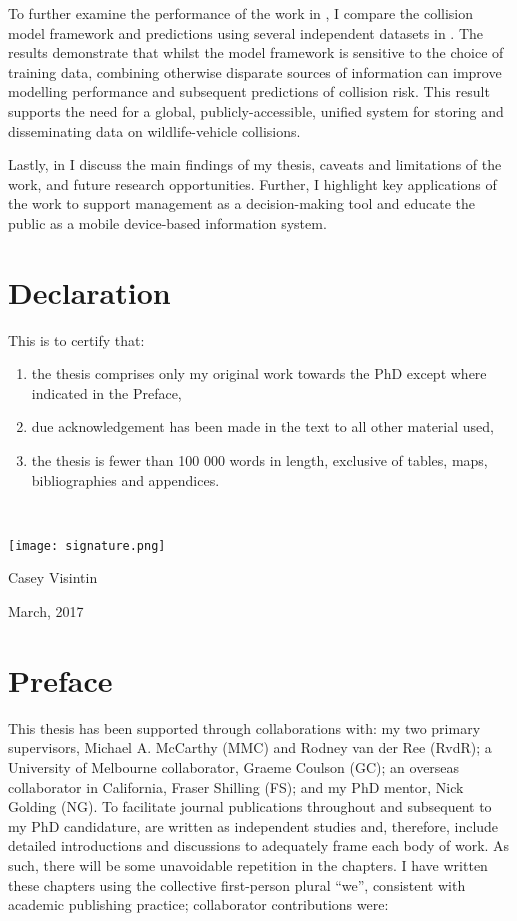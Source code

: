 \documentclass[titlesmallcaps,copyrightpage,examinerscopy]{uomthesis}
\begin{document}
To further examine the performance of the work in , I compare the collision model framework and predictions using several independent datasets in . The results demonstrate that whilst the model framework is sensitive to the choice of training data, combining otherwise disparate sources of information can improve modelling performance and subsequent predictions of collision risk. This result supports the need for a global, publicly-accessible, unified system for storing and disseminating data on wildlife-vehicle collisions.

Lastly, in  I discuss the main findings of my thesis, caveats and limitations of the work, and future research opportunities. Further, I highlight key applications of the work to support management as a decision-making tool and educate the public as a mobile device-based information system.
\clearpage{\pagestyle{empty}\cleardoublepage}

\chapter{Declaration}
This is to certify that:
{\renewcommand{\theenumi}{\roman{enumi}}%
\begin{enumerate}
 \item the thesis comprises only my original work towards the PhD except where indicated in the Preface,
 \item due acknowledgement has been made in the text to all other material used,
 \item the thesis is fewer than 100 000 words in length, exclusive of tables, maps, bibliographies and appendices.
\end{enumerate}
}
\hrulefill \\

\begin{flushright} 
\texttt{[image: signature.png]}

Casey Visintin

March, 2017
\end{flushright}
\clearpage{\pagestyle{empty}\cleardoublepage}

\chapter{Preface}
This thesis has been supported through collaborations with: my two primary supervisors, Michael A. McCarthy (MMC) and Rodney van der Ree (RvdR); a University of Melbourne collaborator, Graeme Coulson (GC); an overseas collaborator in California, Fraser Shilling (FS); and my PhD mentor, Nick Golding (NG). To facilitate journal publications throughout and subsequent to my PhD candidature,  are written as independent studies and, therefore, include detailed introductions and discussions to adequately frame each body of work. As such, there will be some unavoidable repetition in the chapters. I have written these chapters using the collective first-person plural ``we'', consistent with academic publishing practice; collaborator contributions were:
\end{document}
